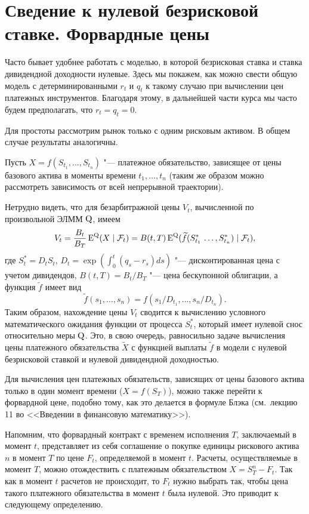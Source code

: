 \section{Сведение к нулевой безрисковой ставке. Форвардные цены}
\label{gen:s:forward}

Часто бывает удобнее работать с моделью, в которой безрисковая ставка и ставка дивидендной доходности нулевые.
Здесь мы покажем, как можно свести общую модель с детерминированными $r_t$ и $q_t$ к такому случаю при вычислении цен платежных инструментов.
Благодаря этому, в дальнейшей части курса мы часто будем предполагать, что $r_t=q_t=0$.

Для простоты рассмотрим рынок только с одним рисковым активом.
В общем случае результаты аналогичны.

Пусть $X = f(S_{t_1},\dots, S_{t_n})$ "--- платежное обязательство, зависящее от цены базового актива в моменты времени $t_1,\dots,t_n$ (таким же образом можно рассмотреть зависимость от всей непрерывной траектории). 

Нетрудно видеть, что для безарбитражной цены $V_t$, вычисленной по произвольной ЭЛММ $\mathrm{Q}$, имеем
\[
V_t = \frac{B_t}{B_T} \operatorname{E}^{\mathrm{Q}}(X \mid \mathcal{F}_t) = B(t,T) \operatorname{E}^{\mathrm{Q}} (\widetilde f(S^*_{t_1}\,\dots,S^*_{t_n}) \mid \mathcal{F}_t),
\]
где $S_t^* = D_tS_t$, $D_t = \exp(\int_0^t (q_s-r_s)ds)$ "--- дисконтированная цена с учетом дивидендов, $B(t,T) = B_t/B_T$ "--- цена бескупонной облигации, а функция $\tilde f$ имеет вид
\[
\tilde f(s_1,\dots,s_n) = f(s_1/D_{t_1},\dots, s_n/D_{t_n}).
\]
Таким образом, нахождение цены $V_t$ сводится к вычислению условного математического ожидания функции от процесса $S_t^*$, который имеет нулевой снос относительно меры $\mathrm{Q}$.
Это, в свою очередь, равносильно задаче вычисления цены платежного обязательства $\tilde X$ с функцией выплаты $\tilde f$ в модели с нулевой безрисковой ставкой и нулевой дивидендной доходностью.

Для вычисления цен платежных обязательств, зависящих от цены базового актива только в один момент времени ($X=f(S_T)$), можно также перейти к форвардной цене, подобно тому, как это делается в формуле Блэка (см.~лекцию 11 во <<Введении в финансовую математику>>).

Напомним, что форвардный контракт с временем исполнения $T$, заключаемый в момент $t$, представляет из себя соглашение о покупке единицы рискового актива $n$ в момент $T$ по цене $F_t$, определяемой в момент $t$. 
Расчеты, осуществляемые в момент $T$, можно отождествить с платежным обязательством $X=S_T^n - F_t$.
Так как в момент $t$ расчетов не происходит, то $F_t$ нужно выбрать так, чтобы цена такого платежного обязательства в момент $t$ была нулевой.
Это приводит к следующему определению.

